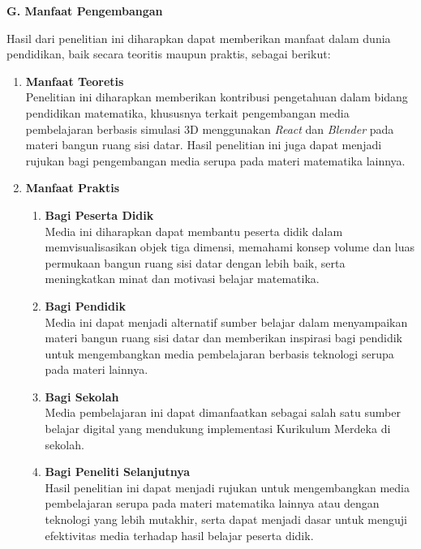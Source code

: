 \textbf{G. Manfaat Pengembangan}

\hspace*{1cm}Hasil dari penelitian ini diharapkan dapat memberikan manfaat dalam dunia pendidikan, baik secara teoritis maupun praktis, sebagai berikut:

\begin{enumerate}
    \item \textbf{Manfaat Teoretis} \\
    Penelitian ini diharapkan memberikan kontribusi pengetahuan dalam bidang pendidikan matematika, khususnya terkait pengembangan media pembelajaran berbasis simulasi 3D menggunakan \textit{React} dan \textit{Blender} pada materi bangun ruang sisi datar. Hasil penelitian ini juga dapat menjadi rujukan bagi pengembangan media serupa pada materi matematika lainnya.

    \item \textbf{Manfaat Praktis}
    \begin{enumerate}
        \item \textbf{Bagi Peserta Didik} \\
        Media ini diharapkan dapat membantu peserta didik dalam memvisualisasikan objek tiga dimensi, memahami konsep volume dan luas permukaan bangun ruang sisi datar dengan lebih baik, serta meningkatkan minat dan motivasi belajar matematika.
        
        \item \textbf{Bagi Pendidik} \\
        Media ini dapat menjadi alternatif sumber belajar dalam menyampaikan materi bangun ruang sisi datar dan memberikan inspirasi bagi pendidik untuk mengembangkan media pembelajaran berbasis teknologi serupa pada materi lainnya.
        
        \item \textbf{Bagi Sekolah} \\
        Media pembelajaran ini dapat dimanfaatkan sebagai salah satu sumber belajar digital yang mendukung implementasi Kurikulum Merdeka di sekolah.
        
        \item \textbf{Bagi Peneliti Selanjutnya} \\
        Hasil penelitian ini dapat menjadi rujukan untuk mengembangkan media pembelajaran serupa pada materi matematika lainnya atau dengan teknologi yang lebih mutakhir, serta dapat menjadi dasar untuk menguji efektivitas media terhadap hasil belajar peserta didik.
    \end{enumerate}
\end{enumerate}

